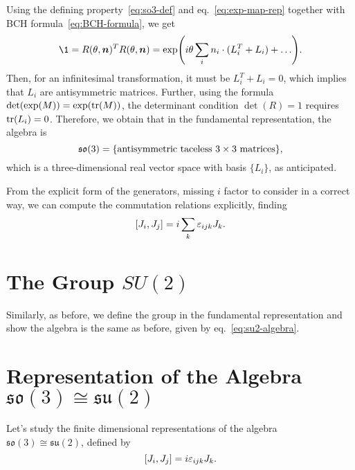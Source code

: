Using the defining property~\eqref{eq:so3-def} and eq.~\eqref{eq:exp-map-rep} together with BCH formula~\eqref{eq:BCH-formula}, we get
\begin{equation*}
    \1 = R(\theta, \vec{n})^T R(\theta, \vec{n}) = \exp({i \theta \sum_i n_i \cdot ({L}_i^T + L_i) + \dots}) .
\end{equation*}
Then, for an infinitesimal transformation, it must be $L^T_i + L_i = 0$, which implies that $L_i$ are antisymmetric matrices. Further, using the formula $\det(\exp(M)) = \exp(\textup{tr}(M))$, the determinant condition $\det(R) = 1$ requires $\tr(L_i) = 0$. Therefore, we obtain that in the fundamental representation, the algebra is
\begin{equation}
    \mathfrak{so}(3) = \{ \textup{antisymmetric taceless $3 \times 3$ matrices}\},
\end{equation}
which is a three-dimensional real vector space with basis $\{L_i\}$, as anticipated.

From the explicit form of the generators, \color{red} missing $i$ factor to consider in a correct way, \color{blue} we can compute the commutation relations explicitly, finding
\begin{equation}\label{eq:su2-algebra}
    \comm{J_i}{J_j} = i \sum_k \epsilon_{ijk} J_k .
\end{equation}

\section{The Group \texorpdfstring{$SU(2)$}{SU(2)}}
\color{red} Similarly, as before, we define the group in the fundamental representation and show the algebra is the same as before, given by eq.~\eqref{eq:su2-algebra}. \color{blue}

\section{Representation of the Algebra \texorpdfstring{$\mathfrak{so}(3) \cong \mathfrak{su}(2)$}{isomorphic}}
Let's study the finite dimensional representations of the algebra $\mathfrak{so}(3) \cong \mathfrak{su}(2)$, defined by
\begin{equation}\label{eq:su2-commutation-relations}
    \comm{J_i}{J_j} = i \epsilon_{ijk} J_k .
\end{equation}

